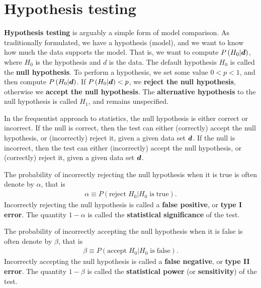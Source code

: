 \section{Hypothesis testing}

\textbf{Hypothesis testing} is arguably a simple form of model comparison.
As traditionally formulated, we have a hypothesis (model), and we want to know how much the data supports the model.
That is, we want to compute $P\left(H_0|{\bm d}\right)$, where $H_0$ is the hypothesis and $d$ is the data.
The default hypothesis $H_0$ is called the \textbf{null hypothesis}.
To perform a hypothesis, we set some value $0<p<1$, and then compute $P\left(H_0|{\bm d}\right)$.
If $P\left(H_0|{\bm d}\right)<p$, we \textbf{reject the null hypothesis}, otherwise we \textbf{accept the null hypothesis}.
The \textbf{alternative hypothesis} to the null hypothesis is called $H_1$, and remains unspecified.

In the frequentist approach to statistics, the null hypothesis is either correct or incorrect.
If the null is correct, then the test can either (correctly) accept the null hypothesis, or (incorrectly) reject it, given a given data set ${\bm d}$.
If the null is incorrect, then the test can either (incorrectly) accept the null hypothesis, or (correctly) reject it, given a given data set ${\bm d}$.

The probability of incorrectly rejecting the null hypothesis when it is true is often denote by $\alpha$, that is
\begin{align}
    \alpha
    \equiv
    P\left(\mathrm{reject}\;H_0|H_0\;\mathrm{is\;true}\right)
    .
\end{align}
Incorrectly rejecting the null hypothesis is called a \textbf{false positive}, or \textbf{type I error}.
The quantity $1-\alpha$ is called the \textbf{statistical significance} of the test.

The probability of incorrectly accepting the null hypothesis when it is false is often denote by $\beta$, that is
\begin{align}
    \beta
    \equiv
    P\left(\mathrm{accept}\;H_0|H_0\;\mathrm{is\;false}\right)
    .
\end{align}
Incorrectly accepting the null hypothesis is called a \textbf{false negative}, or \textbf{type II error}.
The quantity $1-\beta$ is called the \textbf{statistical power} (or \textbf{sensitivity}) of the test.


